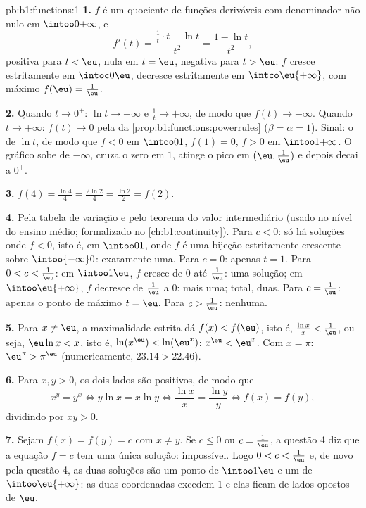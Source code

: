 \begin{solution}{pb:b1:functions:1}
\textbf{1.} $f$ é um quociente de funções deriváveis com
denominador não nulo em $\intoo0{+\infty}$, e
\[
f'(t) = \frac{\frac1t \cdot t - \ln t}{t^2} = \frac{1 - \ln
t}{t^2} ,
\]
positiva para $t < \eu$, nula em $t = \eu$, negativa para $t > \eu$:
$f$ cresce estritamente em $\intoc0\eu$, decresce estritamente em
$\intco\eu{+\infty}$, com máximo $f(\eu) = \frac1\eu$.

\textbf{2.} Quando $t \to 0^+$: $\ln t \to -\infty$ e $\frac1t \to
+\infty$, de modo que $f(t) \to -\infty$. Quando $t \to +\infty$: $f(t) \to 0$
pela  da \cref{prop:b1:functions:powerrules}
($\beta = \alpha = 1$). Sinal: o de $\ln t$, de modo que $f < 0$ em
$\intoo01$, $f(1) = 0$, $f > 0$ em $\intoo1{+\infty}$. O gráfico
sobe de $-\infty$, cruza o zero em $1$, atinge o pico em $(\eu,
\frac1\eu)$ e depois decai a $0^+$.

\textbf{3.} $f(4) = \frac{\ln 4}4 = \frac{2\ln 2}4 = \frac{\ln 2}2
= f(2)$.

\textbf{4.} Pela tabela de variação e pelo teorema do valor
intermediário (usado no nível do ensino médio; formalizado no
\cref{ch:b1:continuity}). Para $c < 0$: só há soluções onde
$f < 0$, isto é, em $\intoo01$, onde $f$ é uma bijeção estritamente
crescente sobre $\intoo{-\infty}0$: exatamente uma. Para $c = 0$: apenas
$t = 1$. Para $0 < c < \frac1\eu$: em $\intoo1\eu$, $f$ cresce
de $0$ até $\frac1\eu$: uma solução; em $\intoo\eu{+\infty}$,
$f$ decresce de $\frac1\eu$ a $0$: mais uma; total, duas. Para
$c = \frac1\eu$: apenas o ponto de máximo $t = \eu$. Para $c >
\frac1\eu$: nenhuma.

\textbf{5.} Para $x \neq \eu$, a maximalidade estrita dá $f(x) <
f(\eu)$, isto é, $\frac{\ln x}x < \frac1\eu$, ou seja, $\eu\ln x < x$,
isto é, $\ln(x^\eu) < \ln(\eu^x)$: $x^\eu < \eu^x$. Com $x = \pi$:
$\eu^\pi > \pi^\eu$ (numericamente, $23.14 > 22.46$).

\textbf{6.} Para $x, y > 0$, os dois lados são positivos, de modo que
\[
x^y = y^x \iff y\ln x = x\ln y \iff \frac{\ln x}x = \frac{\ln y}y
\iff f(x) = f(y) ,
\]
dividindo por $xy > 0$.

\textbf{7.} Sejam $f(x) = f(y) = c$ com $x \neq y$. Se $c \leq 0$ ou
$c = \frac1\eu$, a questão 4 diz que a equação $f = c$ tem uma única
solução: impossível. Logo $0 < c < \frac1\eu$ e, de novo pela
questão 4, as duas soluções são um ponto de $\intoo1\eu$ e um
de $\intoo\eu{+\infty}$: as duas coordenadas excedem $1$ e elas
ficam de lados opostos de $\eu$.


\end{solution}
